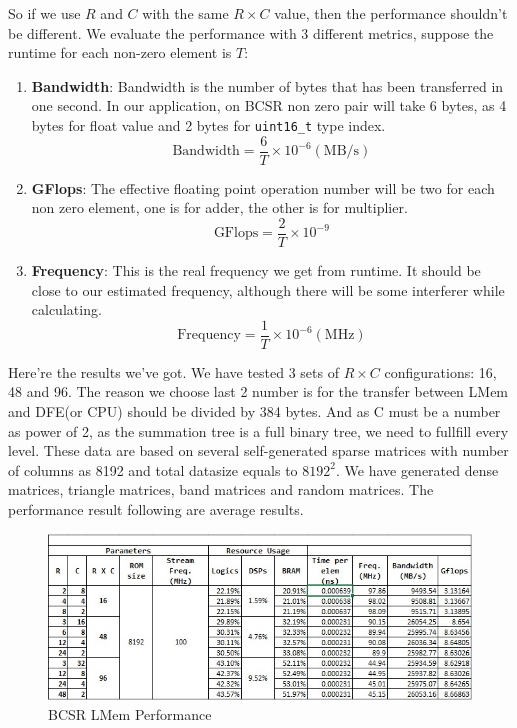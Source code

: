 \documentclass[a4paper, 10pt]{report}
\begin{document}
So if we use $R$ and $C$ with the same $R \times C$ value, then the performance shouldn't be different. We evaluate the performance with 3 different metrics, suppose the runtime for each non-zero element is $T$:
\begin{enumerate}
\item \textbf{Bandwidth}: Bandwidth is the number of bytes that has been transferred in one second. In our application, on BCSR non zero pair will take 6 bytes, as 4 bytes for float value and 2 bytes for \texttt{uint16\_t} type index.
$$\text{Bandwidth} = \frac{6}{T}\times 10^{-6} (\text{MB/s})$$
\item \textbf{GFlops}: The effective floating point operation number will be two for each non zero element, one is for adder, the other is for multiplier.
$$\text{GFlops} = \frac{2}{T} \times 10^{-9} $$
\item \textbf{Frequency}: This is the real frequency we get from runtime. It should be close to our estimated frequency, although there will be some interferer while calculating.
$$\text{Frequency} = \frac{1}{T} \times 10^{-6} (\text{MHz})$$
\end{enumerate}

Here're the results we've got. We have tested 3 sets of $R\times C$ configurations: 16, 48 and 96. The reason we choose last 2 number is for the transfer between LMem and DFE(or CPU) should be divided by 384 bytes. And as C must be a number as power of 2, as the summation tree is a full binary tree, we need to fullfill every level. These data are based on several self-generated sparse matrices with number of columns as 8192 and total datasize equals to $8192^2$. We have generated dense matrices, triangle matrices, band matrices and random matrices. The performance result following are average results.

\begin{figure}[h!]
  \caption{BCSR LMem Performance}
  \centering
    \includegraphics[width=1.0\textwidth]{bcsr-lmem-perf}
\end{figure}
\end{document}
